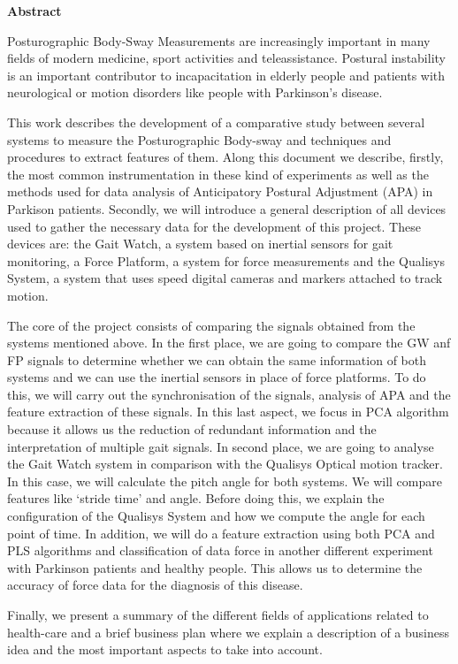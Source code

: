 \begin{titlepage}
\label{ch:abstract}
{ \huge \bfseries Abstract \\[0.4cm] }

Posturographic Body-Sway Measurements are increasingly important in many fields of modern medicine, sport activities and teleassistance.  Postural instability is an important contributor to incapacitation in elderly people and patients with neurological or motion disorders like people with Parkinson’s disease.

This work describes the development  of a comparative study between several systems to measure the Posturographic Body-sway and techniques and procedures to extract features of them. Along this document we describe, firstly, the most common  instrumentation in these kind of experiments as well as the methods  used for data analysis of Anticipatory Postural Adjustment (APA) in Parkison patients. Secondly, we will introduce a general description of all devices used to gather the necessary data  for the development of  this project. These devices are: the Gait Watch, a system based on inertial sensors for gait monitoring, a Force Platform, a system for force measurements and the Qualisys System, a system that uses speed digital cameras and markers attached to track motion.

The core of the project consists of comparing the signals obtained from the systems mentioned above. In the first place, we are going to compare the GW anf FP signals to determine whether we can obtain the same information of both systems and we can use the inertial sensors in place of force platforms. To do this, we will carry out the synchronisation of the signals, analysis of APA and the feature extraction of these signals. In this last aspect, we focus in PCA algorithm because it allows us the reduction of redundant information and the interpretation of multiple gait signals. In second place, we are going to analyse the Gait Watch system in comparison with the Qualisys Optical motion tracker. In this case, we will calculate the pitch angle for both systems. We will compare features like ‘stride time’ and angle. Before doing this, we explain  the configuration of the  Qualisys System and how we compute the angle for each point of time. In addition, we will do a feature extraction using both PCA and PLS algorithms and classification of data force in another different experiment with Parkinson patients and healthy people. This allows us to determine the accuracy of force data for the diagnosis of this disease.

Finally, we present a summary of the different fields of applications related to health-care and a brief  business plan where we explain a description of a business idea and the most important aspects to take into account.

\end{titlepage} 